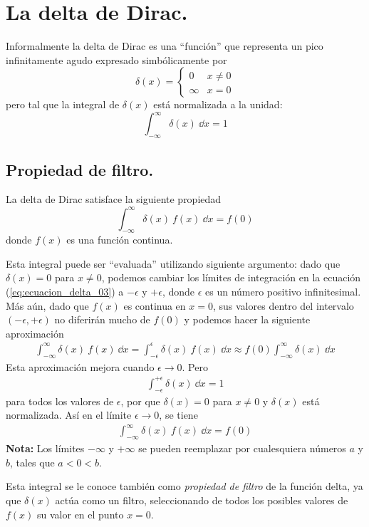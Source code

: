 \documentclass[12pt]{beamer}
\begin{document}
\section{La delta de Dirac.}

Informalmente la delta de Dirac es una \enquote{función} que representa un pico infinitamente agudo expresado simbólicamente por
\begin{equation}
\delta (x) = \begin{cases}
0 & x \neq 0 \\
\infty & x = 0
\end{cases}
\label{eq:ecuacion_delta_01}
\end{equation}
pero tal que la integral de $\delta (x)$ está normalizada a la unidad:
\begin{equation}
\int_{-\infty}^{\infty} \delta (x) \: \dd{x} = 1 
\label{eq:ecuacion_delta_02}
\end{equation}
\subsection{Propiedad de filtro.}
La delta de Dirac satisface la siguiente propiedad
\begin{equation}
\int_{-\infty}^{\infty} \delta (x) \: f(x) \: \dd{x} = f(0)
\label{eq:ecuacion_delta_03}
\end{equation}
donde $f(x)$ es una función continua.
\par
Esta integral puede ser \enquote{evaluada} utilizando siguiente argumento: dado que $\delta (x) = 0$
para $x \neq 0$, podemos cambiar los límites de integración en la ecuación (\ref{eq:ecuacion_delta_03}) a $- \epsilon$ y $+ \epsilon$, donde $\epsilon$ es un número positivo infinitesimal. Más aún, dado que $f(x)$ es continua en $x = 0$, sus valores dentro del intervalo $( - \epsilon, + \epsilon)$ no diferirán mucho de $f(0)$ y podemos hacer la siguiente aproximación
\begin{align*}
\int_{-\infty}^{\infty} \delta (x) \: f(x) \: \dd{x} = \int_{-\epsilon}^{\epsilon} \delta (x) \: f(x) \: \dd{x} \approx f(0) \int_{-\infty}^{\infty} \delta (x) \: \dd{x}
\end{align*}
Esta aproximación mejora cuando $\epsilon \to 0$. Pero
\begin{align*}
\int_{-\epsilon}^{+\epsilon} \delta (x) \: \dd{x} = 1
\end{align*}
para todos los valores de $\epsilon$, por que $\delta (x) = 0$ para $x \neq 0$ y $\delta (x)$ está normalizada. Así en el límite $\epsilon \to 0$, se tiene
\begin{align*}
\int_{-\infty}^{\infty} \delta (x) \: f(x) \: \dd{x} = f(0)
\end{align*}
\textbf{Nota: } Los límites $-\infty$ y $+\infty$ se pueden reemplazar por cualesquiera números $a$ y $b$, tales que $a < 0 < b$.
\par
Esta integral se le conoce también como \emph{propiedad de filtro} de la función delta, ya que $\delta (x)$ actúa como un filtro, seleccionando de todos los posibles valores de $f(x)$ su valor en el punto $x=0$.
\end{document}
